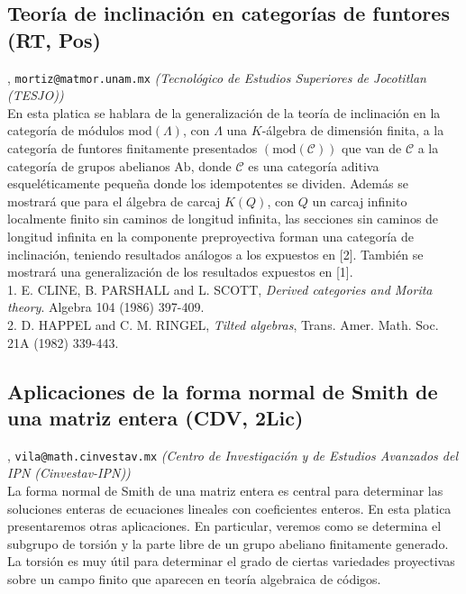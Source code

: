 \subsection{\sffamily Teor\'ia de inclinaci\'on en categor\'ias de funtores {\footnotesize (RT, Pos)}} \label{reg-1684} 
, {\tt mortiz@matmor.unam.mx}  {\slshape (Tecnol\'ogico de Estudios Superiores de Jocotitlan (TESJO))}\\
          \noindent En esta platica se hablara de la generalizaci\'on de la teor\'ia de inclinaci\'on en la categor\'ia de m\'odulos  $\mathrm{mod}(\Lambda)$, con $\Lambda$ una $K$-\'algebra de dimensi\'on finita, a la categor\'ia de funtores finitamente  presentados $(\mathrm{mod}(\mathcal{C}))$  que van de $\mathcal{C}$ a  la categor\'ia de grupos abelianos $\mathrm{Ab}$,  donde $\mathcal{C}$ es una categor\'ia aditiva esquel\'eticamente peque\~na donde los idempotentes se dividen.    Adem\'as se mostrar\'a que para  el \'algebra de carcaj $K(Q)$, con $Q$ un carcaj infinito localmente finito sin caminos de longitud infinita,  las secciones sin caminos de longitud infinita en la componente preproyectiva  forman una categor\'ia de inclinaci\'on, teniendo resultados an\'alogos a los expuestos en [2]. Tambi\'en se mostrar\'a una generalizaci\'on de los resultados expuestos en [1].\\ 1. E. CLINE, B. PARSHALL and L. SCOTT, \emph{Derived categories and Morita theory}. Algebra 104 (1986) 397-409.\\ 2. D. HAPPEL and C. M. RINGEL, \emph{Tilted algebras}, Trans. Amer. Math. Soc. 21A (1982) 339-443.
\subsection{\sffamily Aplicaciones de la forma normal de Smith de una matriz entera {\footnotesize (CDV, 2Lic)}} \label{reg-423} 
, {\tt vila@math.cinvestav.mx}  {\slshape (Centro de Investigaci\'on y de Estudios Avanzados del IPN (Cinvestav-IPN))}\\
          \noindent La forma normal de Smith de una matriz entera es central para determinar las soluciones enteras de ecuaciones lineales con coeficientes enteros. En esta platica presentaremos otras aplicaciones. En particular, veremos como se determina el subgrupo de torsi\'on y la parte libre de un grupo abeliano finitamente generado. La torsi\'on es muy \'util para determinar el grado de ciertas variedades proyectivas  sobre un campo finito que aparecen en teor\'ia algebraica de c\'odigos.
